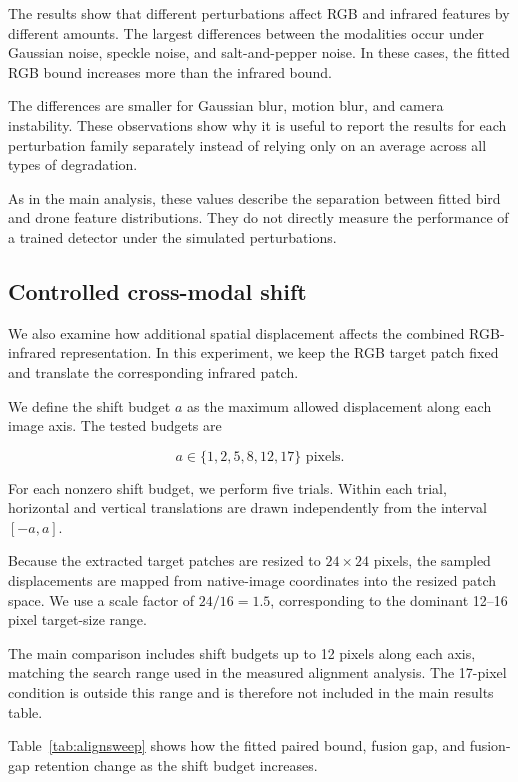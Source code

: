 \documentclass[10pt]{article}
\begin{document}
The results show that different perturbations affect RGB and infrared features by different amounts. The largest differences between the modalities occur under Gaussian noise, speckle noise, and salt-and-pepper noise. In these cases, the fitted RGB bound increases more than the infrared bound.

The differences are smaller for Gaussian blur, motion blur, and camera instability. These observations show why it is useful to report the results for each perturbation family separately instead of relying only on an average across all types of degradation.

As in the main analysis, these values describe the separation between fitted bird and drone feature distributions. They do not directly measure the performance of a trained detector under the simulated perturbations.

\subsection{Controlled cross-modal shift}

We also examine how additional spatial displacement affects the combined RGB-infrared representation. In this experiment, we keep the RGB target patch fixed and translate the corresponding infrared patch.

We define the shift budget $a$ as the maximum allowed displacement along each image axis. The tested budgets are

\begin{equation}
a\in\{1,2,5,8,12,17\}\text{ pixels}.
\end{equation}

For each nonzero shift budget, we perform five trials. Within each trial, horizontal and vertical translations are drawn independently from the interval $[-a,a]$.

Because the extracted target patches are resized to $24\times24$ pixels, the sampled displacements are mapped from native-image coordinates into the resized patch space. We use a scale factor of $24/16=1.5$, corresponding to the dominant 12--16 pixel target-size range.

The main comparison includes shift budgets up to 12 pixels along each axis, matching the search range used in the measured alignment analysis. The 17-pixel condition is outside this range and is therefore not included in the main results table.

Table~\ref{tab:alignsweep} shows how the fitted paired bound, fusion gap, and fusion-gap retention change as the shift budget increases.
\end{document}
